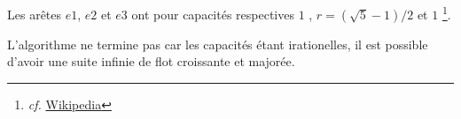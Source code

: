 Les arêtes $e1$, $e2$ et $e3$ ont pour capacités respectives $1$ , $r = ( \sqrt{5} - 1 ) / 2$  et $1$ \footnote{\textit{cf.} \href{https://fr.wikipedia.org/wiki/Algorithme_de_Ford-Fulkerson\#Terminaison}{Wikipedia}}.

L'algorithme ne termine pas car les capacités étant irationelles, il est possible d'avoir une suite infinie de flot croissante et majorée.